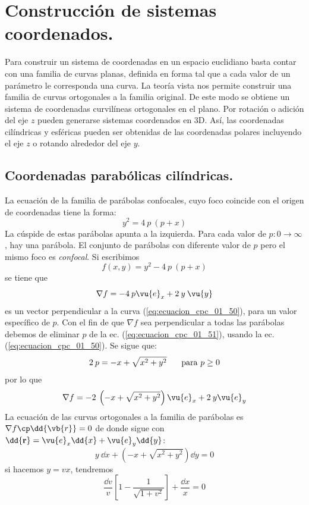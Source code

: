 \section{Construcción de sistemas coordenados.}
Para construir un sistema de coordenadas en un espacio euclidiano basta contar con una familia de curvas planas, definida en forma tal que a cada valor de un parámetro le corresponda una curva. La teoría vista nos permite construir una familia de curvas ortogonales a la familia original. De este modo se obtiene un sistema de coordenadas curvilíneas ortogonales en el plano. Por rotación o adición del eje $z$ pueden generarse sistemas coordenados en 3D. Así, las coordenadas cilíndricas y esféricas pueden ser obtenidas de las coordenadas polares incluyendo el eje $z$ o rotando alrededor del eje $y$.
\subsection{Coordenadas parabólicas cilíndricas.}
La ecuación de la familia de parábolas confocales, cuyo foco coincide con el origen de coordenadas tiene la forma:
\begin{equation}
y^{2} = 4 \: p \: (p + x)
\label{eq:ecuacion_cpc_01_50}
\end{equation}
La cúspide de estas parábolas apunta a la izquierda. Para cada valor de $p: 0 \to \infty$, hay una parábola. El conjunto de parábolas con diferente valor de $p$ pero el mismo foco es \emph{confocal}. Si escribimos
\[ f(x,y) = y^{2} - 4 \: p \: (p + x) \]
se tiene que
\begin{equation}
\nabla f = - 4 \: p \vu{e}_{x} + 2 \: y \: \vu{y}
\label{eq:ecuacion_cpc_01_51}
\end{equation}
es un vector perpendicular a la curva (\ref{eq:ecuacion_cpc_01_50}), para un valor específico de $p$. Con el fin de que $\nabla f$ sea perpendicular a todas las parábolas debemos de eliminar $p$ de la ec. (\ref{eq:ecuacion_cpc_01_51}), usando la ec. (\ref{eq:ecuacion_cpc_01_50}). Se sigue que:
\[ 2 \: p = -x + \sqrt{x^{2} + y^{2}} \hspace{0.5cm} \mbox{ para } p \geq 0 \]
por lo que
\[ \nabla f =  -2 \: \left( -x + \sqrt{x^{2} + y^{2}} \right) \vu{e}_{x} + 2 \: y \vu{e}_{y} \]
La ecuación de las curvas ortogonales a la familia de parábolas es $\nabla f \cp \dd{\vb{r}} = 0$ de donde sigue con $\dd{\mathbf{r}} = \vu{e}_{x} \dd{x} + \vu{e}_{y} \dd{y}$:
\[ y \: \dd{x} +  \left( - x + \sqrt{x^{2} + y^{2}} \right) \dd{y} = 0 \]
si hacemos $y = vx$, tendremos
\[ \dfrac{\dd{v}}{v} \left[ 1 - \dfrac{1}{\sqrt{1 + v^{2}}} \right] + \dfrac{\dd{x}}{x} = 0 \]
